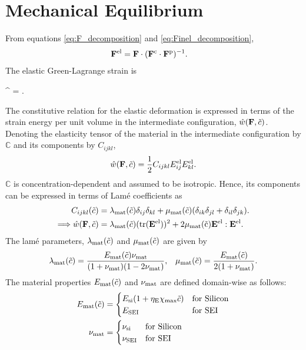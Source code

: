 \section{Mechanical Equilibrium } \label{section:MechEqbm}
From equations \ref{eq:F_decomposition} and \ref{eq:Finel_decomposition},
\begin{align}
    \mathbf{F}^{{\rm{el}}} &=  \mathbf{F} \cdot (\mathbf{F}^{{\rm{c}}} \cdot \mathbf{F}^{{\rm{p}}})^{-1}. \label{eq:Fel_tensor}
\end{align}
The elastic Green-Lagrange strain is
\begin{nonumbereq}
\E^{\el} =  \left[ (\F^\el)^\T \cdot  \F^\el - \I \right].
\end{nonumbereq}

The constitutive relation for the elastic deformation is expressed in terms of the strain energy per unit volume in the intermediate configuration, $\hat{w}(\mathbf{F}, \tilde{c})$. Denoting the elasticity tensor of the material in the intermediate configuration by $\mathbb{C}$ and its components by $C_{ijkl}$,
\begin{gather}
    \hat{w}(\mathbf{F}, \tilde{c}) = \frac{1}{2} C_{ijkl} E_{ij}^{{\rm{el}}} E_{kl}^{{\rm{el}}}.
\end{gather}
$\mathbb{C}$ is concentration-dependent and assumed to be isotropic. Hence, its components can be expressed in terms of Lam\'{e} coefficients as 
\begin{align}
 C_{ijkl}(\tilde{c}) &= \lambda_{\rm{mat}}(\tilde{c})\delta_{ij} \delta_{kl} +  \mu_{\rm{mat}}(\tilde{c})(\delta_{ik} \delta_{jl} + \delta_{il} \delta_{jk}). \\
    \Longrightarrow \hat{w}(\mathbf{F}, \tilde{c}) &= \lambda_{\rm{mat}}(\tilde{c}) (\rm{tr}(\mathbf{E}^{\rm{el}}))^2 + 2 \mu_{\rm{mat}}(\tilde{c}) \mathbf{E}^{{\rm{el}}}:\mathbf{E}^{{\rm{el}}}.
\end{align}
The lam\'{e} parameters, $\lambda_{\rm{mat}}(\tilde{c})$ and $\mu_{\rm{mat}}(\tilde{c})$ are given by
\begin{align}
    \lambda_{\rm{mat}}(\tilde{c}) = \frac{E_{\rm{mat}}(\tilde{c}) \nu_{\rm{mat}}}{(1+\nu_{\rm{mat}})(1-2\nu_{\rm{mat}})},
    && \mu_{\rm{mat}}(\tilde{c}) = \frac{E_{\rm{mat}}(\tilde{c})}{2(1+\nu_{\rm{mat}})}. \nonumber
\end{align}
The material properties $E_{\rm{mat}}(\tilde{c})$ and $\nu_{\rm{mat}}$ are defined domain-wise as follows:
\begin{align}
E_{\rm{mat}}(\tilde{c}) &= \begin{cases}
 E_{\text{si}}(1 + \eta_{\rm{E}} \chi_{\rm{max}} \tilde{c}) & \text{for Silicon}\\
 E_{\rm{SEI}} & \text{for SEI }
\end{cases} \\
\nu_{\rm{mat}} &= \begin{cases}
\nu_{\rm{si}} & \text{for Silicon} \\
\nu_{\rm{SEI}} &  \text{for SEI }
\end{cases}
\end{align}
